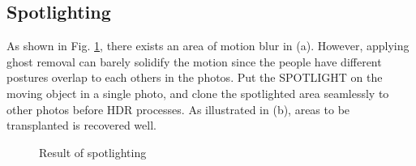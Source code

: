 \documentclass[11pt]{article}
\begin{document}
\subsection{Spotlighting}
As shown in Fig. \ref{fig:spotlight}, there exists an area of motion blur in (a). However, applying ghost removal can barely solidify the motion since the people have different postures overlap to each others in the photos. Put the SPOTLIGHT on the moving object in a single photo, and clone the spotlighted area seamlessly to other photos before HDR processes. As illustrated in (b), areas to be transplanted is recovered well.

\begin{figure}[!ht]
  \centering
  \caption{Result of spotlighting}
  \label{fig:spotlight}
\end{figure}
\end{document}

